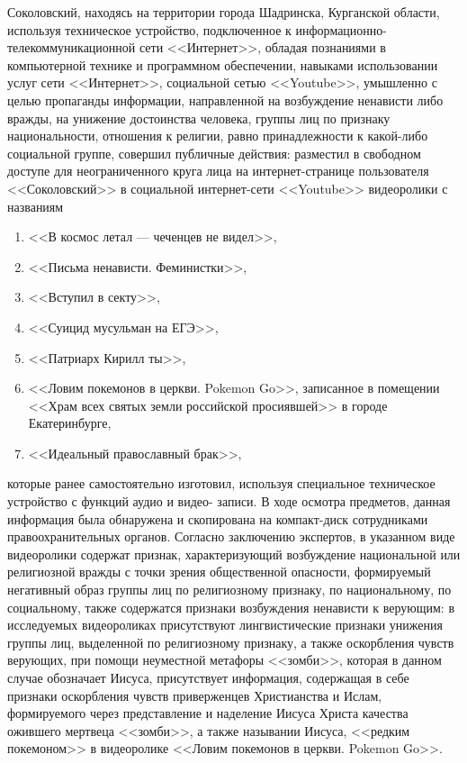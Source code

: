 \documentclass[a4paper]{article}
\begin{document}
		Соколовский, находясь на территории города Шадринска, Курганской области, используя техническое устройство, подключенное к информационно-телекоммуникационной сети <<Интернет>>, обладая познаниями в компьютерной технике и программном обеспечении, навыками использовании услуг сети <<Интернет>>, социальной сетью <<Youtube>>, умышленно с целью пропаганды информации, направленной на возбуждение ненависти либо вражды, на унижение достоинства человека, группы лиц по признаку национальности, отношения к религии, равно принадлежности к какой-либо социальной группе, совершил публичные действия: разместил в свободном доступе для неограниченного круга лица на интернет-странице пользователя <<Соколовский>> в социальной интернет-сети <<Youtube>> видеоролики с названиям
		\begin{enumerate}
			\item <<В космос летал --- чеченцев не видел>>,
			
			\item <<Письма ненависти. Феминистки>>,
			
			\item <<Вступил в секту>>,
			
			\item <<Суицид мусульман на ЕГЭ>>,
			
			\item <<Патриарх Кирилл ты>>,
			
			\item <<Ловим покемонов в церкви. Pokemon Go>>, записанное в помещении <<Храм всех святых земли российской просиявшей>> в городе Екатеринбурге,
			
			\item <<Идеальный православный брак>>,
		\end{enumerate}
		
		которые ранее самостоятельно изготовил, используя специальное техническое устройство с функций аудио и видео- записи. В ходе осмотра предметов, данная информация была обнаружена и скопирована на компакт-диск сотрудниками правоохранительных органов. Согласно заключению экспертов, в указанном виде видеоролики содержат признак, характеризующий возбуждение национальной или религиозной вражды с точки зрения общественной опасности, формируемый негативный образ группы лиц по религиозному признаку, по национальному, по социальному, также содержатся признаки возбуждения ненависти к верующим: в исследуемых видеороликах присутствуют лингвистические признаки унижения группы лиц, выделенной по религиозному признаку, а также оскорбления чувств верующих, при помощи неуместной метафоры <<зомби>>, которая в данном случае обозначает Иисуса, присутствует информация, содержащая в себе признаки оскорбления чувств приверженцев Христианства и Ислам, формируемого через представление и наделение Иисуса Христа качества ожившего мертвеца <<зомби>>, а также назывании Иисуса, <<редким покемоном>> в видеоролике <<Ловим покемонов в церкви. Pokemon Go>>.
		 
\end{document}
